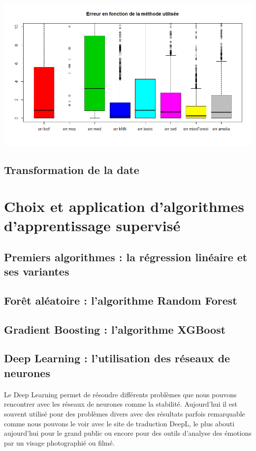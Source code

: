 \documentclass[14pt, openany]{article}
\begin{document}
\includegraphics[width=17cm]{Images/err_imp.png}
\begin{center}
\label{fig1}
\end{center}

\subsection{Transformation de la date}

\section{Choix et application d'algorithmes d'apprentissage supervisé}

\subsection{Premiers algorithmes : la régression linéaire et ses variantes}

\subsection{Forêt aléatoire : l'algorithme Random Forest}

\subsection{Gradient Boosting : l'algorithme XGBoost}

\subsection{Deep Learning : l'utilisation des réseaux de neurones}
\paragraph{}
Le Deep Learning permet de résoudre différents problèmes que nous pouvons rencontrer avec les réseaux de neurones comme la stabilité. Aujourd'hui il est souvent utilisé pour des problèmes divers avec des résultats parfois remarquable comme nous pouvons le voir avec le site de traduction DeepL, le plus abouti aujourd'hui pour le grand public ou encore pour des outils d'analyse des émotions par un visage photographié ou filmé.
\end{document}
